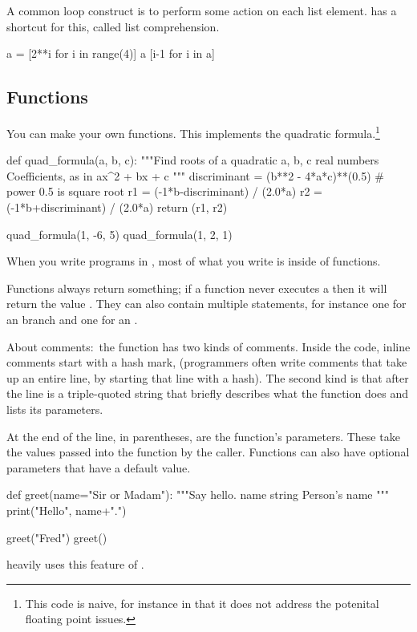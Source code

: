 A common loop construct is to perform some action
on each list element.
\python{} has a shortcut for this, called list comprehension.
\begin{pythonconsole}
a = [2**i for i in range(4)]
a
[i-1 for i in a]
\end{pythonconsole}



\subsection{Functions}
You can make your own functions.
This implements the quadratic formula.\footnote{%
  This code is naive, for instance in that it does not address the
  potenital floating point issues.}
\begin{pythonconsole}
def quad_formula(a, b, c):
    """Find roots of a quadratic 
      a, b, c  real numbers  Coefficients, as in ax^2 + bx + c
    """
    discriminant = (b**2 - 4*a*c)**(0.5)  # power 0.5 is square root
    r1 = (-1*b-discriminant) / (2.0*a)
    r2 = (-1*b+discriminant) / (2.0*a)
    return (r1, r2)

quad_formula(1, -6, 5)
quad_formula(1, 2, 1)
\end{pythonconsole}
When you write programs in \python{}, most of what you write
is inside of functions. 

Functions always return something; 
if a function never executes a  then it will
return the value .
They can also contain multiple  statements, for instance 
one for an  branch and one for an .

About comments:~the  function has two kinds of 
comments.
Inside the code, inline comments start with a hash mark, \inlinecode{\#}
(programmers often write comments that take up an entire line, by starting 
that line with a hash). 
The second kind is that
after the  line is a triple-quoted string that
briefly describes
what the function does and lists its parameters.

At the end of the  line, in parentheses, are
the function's parameters. 
These take the values 
passed into the function by the caller.
Functions can also have optional parameters that have a default value.
\begin{pythonconsole}
def greet(name="Sir or Madam"):
    """Say hello.
      name  string  Person's name
    """
    print("Hello", name+".")

greet("Fred")
greet()
\end{pythonconsole}
\Sage{}  heavily uses this feature of \python{}.







